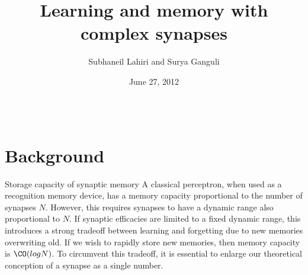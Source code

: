 \documentclass[final,hyperref={pdfpagelabels=false,bookmarks=false}]{beamer}
\title{Learning and memory with complex synapses}
\author{Subhaneil Lahiri and Surya Ganguli}
\institute[Stanford]{%
Department of Applied Physics, Stanford University, Stanford CA
}
\date[6/27/12]{June 27, 2012}
\begin{document}
\begin{frame}{}

\begin{columns}[t]


\begin{column}{0.27\linewidth}

\section{Background}


\begin{block}{Storage capacity of synaptic memory}
%
%
A classical perceptron, when used as a recognition memory device, has a memory capacity proportional to the number of synapses $N$.  
However, this requires synapses to have a dynamic range also proportional to $N$.  If synaptic efficacies
are limited to a fixed dynamic range, this introduces a strong tradeoff between learning and forgetting due to new memories overwriting old.  If we wish to rapidly store new memories, then memory capacity is $ \CO(log N)$.  To circumvent this tradeoff, it is essential to enlarge our theoretical conception of a synapse as a single number.
\end{block}



\end{column}
\end{columns}
\end{frame}
\end{document}
